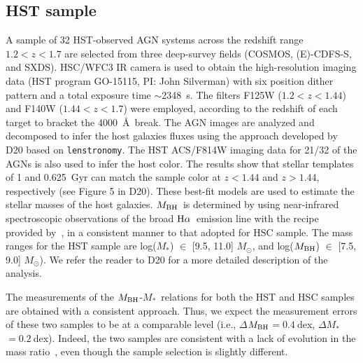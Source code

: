\documentclass[twocolumn]{aastex631}
\def\smass{{$M_*$}}
\def\halpha{${\rm H}\alpha$}
\def\mbh{$M_{\rm BH}$}
\begin{document}
\subsection{HST sample}

A sample of 32 HST-observed AGN systems across the redshift range $1.2<z<1.7$ are selected from three deep-survey fields (COSMOS, (E)-CDFS-S, and SXDS). HSC/WFC3 IR camera is used to obtain the high-resolution imaging data (HST program GO-15115, PI: John Silverman) with six position dither pattern and a total exposure time $\sim$2348~s. The filters F125W ($1.2<z<1.44$) and F140W ($1.44<z<1.7$) were employed, according to the redshift of each target to bracket the 4000~\AA~break.  The AGN images are analyzed and decomposed to infer the host galaxies fluxes using the approach developed by D20 based on {\tt lenstronomy}. The HST ACS/F814W imaging data for 21/32 of the AGNs is also used to infer the host color. The results show that stellar templates of 1 and 0.625~Gyr can match the sample color at $z<1.44$ and $z>1.44$, respectively (see Figure 5 in D20). These best-fit models are used to estimate the stellar masses of the host galaxies. \mbh\ is determined by \citet{Schulze2018} using near-infrared spectroscopic observations of the broad \halpha\ emission line with the recipe provided by~\citet{Vestergaard2006}, in a consistent manner to that adopted for HSC sample. The mass ranges for the HST sample are log(\smass) $\in$ [9.5, 11.0] $M_{\odot}$, and log(\mbh) $\in$  [7.5, 9.0] $M_{\odot}$).
 We refer the reader to D20 for a more detailed description of the analysis. 

The measurements of the \mbh-\smass\ relations for both the HST and HSC samples are obtained with a consistent approach. Thus, we expect the measurement errors of these two samples to be at a comparable level (i.e., $\Delta$\mbh$=0.4~$dex, $\Delta$\smass$=0.2~$dex). 
Indeed, the two samples are consistent with a lack of evolution in the mass ratio~\citep[see Figure 6 of][]{Li2021b}, even though the sample selection is slightly different.
\end{document}
